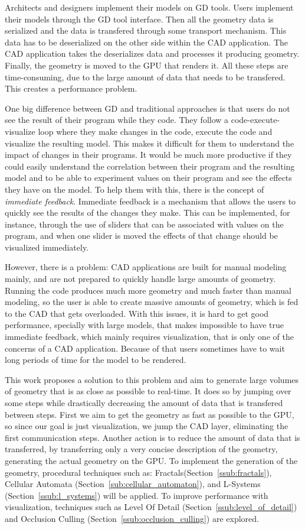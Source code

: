 Architects and designers implement their models on GD tools. Users implement their models through the GD tool interface. Then all the geometry data is serialized and the data is transfered through some transport mechanism. This data has to be deserialized on the other side within the CAD application. The CAD application takes the deserializes data and processes it producing geometry. Finally, the geometry is moved to the GPU that renders it. All these steps are time-consuming, due to the large amount of data that needs to be transfered. This creates a performance problem.

One big difference between GD and traditional approaches is that users do not see the result of their program while they code. They follow a code-execute-visualize loop where they make changes in the code, execute the code and visualize the resulting model. This makes it difficult for them to understand the impact of changes in their programs. It would be much more productive if they could easily understand the correlation between their program and the resulting model and to be able to experiment values on their program and see the effects they have on the model. To help them with this, there is the concept of \emph{immediate feedback}. Immediate feedback is a mechanism that allows the users to quickly see the results of the changes they make. This can be implemented, for instance, through the use of sliders that can be associated with values on the program, and when one slider is moved the effects of that change should be visualized immediately. 

However, there is a problem: CAD applications are built for manual modeling mainly, and are not prepared to quickly handle large amounts of geometry. Running the code produces much more geometry and much faster than manual modeling, so the user is able to create massive amounts of geometry, which is fed to the CAD that gets overloaded. With this issues, it is hard to get good performance, specially with large models, that makes impossible to have true immediate feedback, which mainly requires visualization, that is only one of the concerns of a CAD application. Because of that users sometimes have to wait long periods of time for the model to be rendered.

This work proposes a solution to this problem and aim to generate large volumes of geometry that is as close as possible to real-time. It does so by jumping over some steps while drastically decreasing the amount of data that is transfered between steps. First we aim to get the geometry as fast as possible to the GPU, so since our goal is just visualization, we jump the CAD layer, eliminating the first communication steps. Another action is to reduce the amount of data that is transferred, by transferring only a very concise description of the geometry, generating the actual geometry on the GPU. To implement the generation of the geometry, procedural techniques such as: Fractals(Section~\ref{ssub:fractals}), Cellular Automata (Section~\ref{sub:cellular_automaton}), and L-Systems (Section~\ref{ssub:l_systems}) will be applied. 
To improve performance with visualization, techniques such as Level Of Detail (Section~\ref{ssub:level_of_detail}) and Occlusion Culling (Section~\ref{ssub:occlusion_culling}) are explored.

